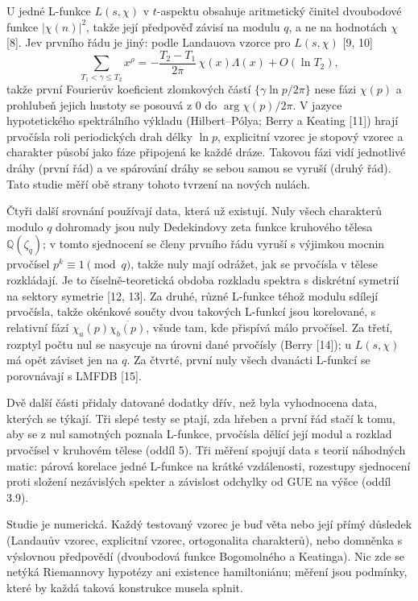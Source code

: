 \documentclass[
  10pt,
]{article}
\begin{document}
U jedné L-funkce \(L(s, \chi)\) v \(t\)-aspektu obsahuje aritmetický
činitel dvoubodové funkce \(|\chi(n)|^2\), takže její předpověď závisí
na modulu \(q\), a ne na hodnotách \(\chi\) {[}8{]}. Jev prvního řádu je
jiný: podle Landauova vzorce pro \(L(s, \chi)\) {[}9, 10{]}
\[\sum_{T_1 < \gamma \le T_2} x^{\rho} = -\frac{T_2 - T_1}{2\pi}\,\chi(x)\Lambda(x) + O(\ln T_2),\]
takže první Fourierův koeficient zlomkových částí
\(\{\gamma\ln p/2\pi\}\) nese fázi \(\chi(p)\) a prohlubeň jejich
hustoty se posouvá z \(0\) do \(\arg\chi(p)/2\pi\). V jazyce
hypotetického spektrálního výkladu (Hilbert--Pólya; Berry a Keating
{[}11{]}) hrají prvočísla roli periodických drah délky \(\ln p\),
explicitní vzorec je stopový vzorec a charakter působí jako fáze
připojená ke každé dráze. Takovou fázi vidí jednotlivé dráhy (první řád)
a ve spárování dráhy se sebou samou se vyruší (druhý řád). Tato studie
měří obě strany tohoto tvrzení na nových nulách.

Čtyři další srovnání používají data, která už existují. Nuly všech
charakterů modulo \(q\) dohromady jsou nuly Dedekindovy zeta funkce
kruhového tělesa \(\mathbb{Q}(\zeta_q)\); v tomto sjednocení se členy
prvního řádu vyruší s výjimkou mocnin prvočísel
\(p^k \equiv 1 \pmod q\), takže nuly mají odrážet, jak se prvočísla v
tělese rozkládají. Je to číselně-teoretická obdoba rozkladu spektra s
diskrétní symetrií na sektory symetrie {[}12, 13{]}. Za druhé, různé
L-funkce téhož modulu sdílejí prvočísla, takže okénkové součty dvou
takových L-funkcí jsou korelované, s relativní fází
\(\chi_a(p)\overline{\chi_b(p)}\), všude tam, kde přispívá málo
prvočísel. Za třetí, rozptyl počtu nul se nasycuje na úrovni dané
prvočísly (Berry {[}14{]}); u \(L(s, \chi)\) má opět záviset jen na
\(q\). Za čtvrté, první nuly všech dvanácti L-funkcí se porovnávají s
LMFDB {[}15{]}.

Dvě další části přidaly datované dodatky dřív, než byla vyhodnocena
data, kterých se týkají. Tři slepé testy se ptají, zda hřeben a první
řád stačí k tomu, aby se z nul samotných poznala L-funkce, prvočísla
dělící její modul a rozklad prvočísel v kruhovém tělese (oddíl 5). Tři
měření spojují data s teorií náhodných matic: párová korelace jedné
L-funkce na krátké vzdálenosti, rozestupy sjednocení proti složení
nezávislých spekter a závislost odchylky od GUE na výšce (oddíl 3.9).

Studie je numerická. Každý testovaný vzorec je buď věta nebo její přímý
důsledek (Landauův vzorec, explicitní vzorec, ortogonalita charakterů),
nebo domněnka s výslovnou předpovědí (dvoubodová funkce Bogomolného a
Keatinga). Nic zde se netýká Riemannovy hypotézy ani existence
hamiltoniánu; měření jsou podmínky, které by každá taková konstrukce
musela splnit.
\end{document}
